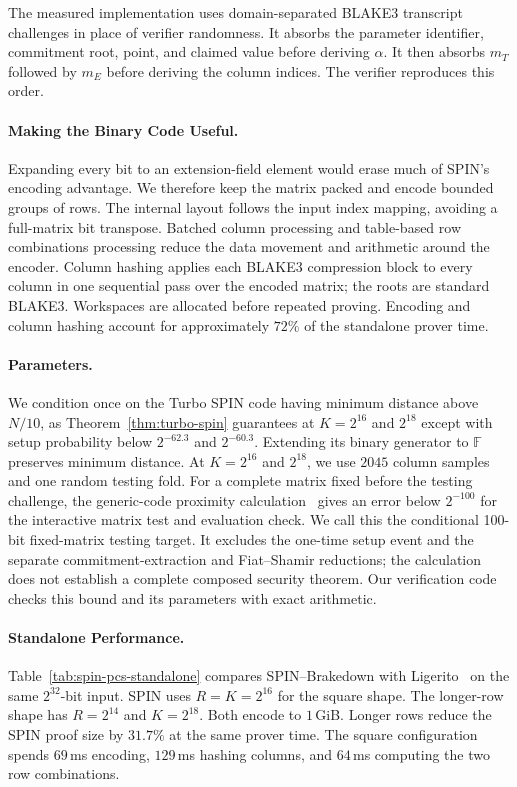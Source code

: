 The measured implementation uses domain-separated BLAKE3 transcript
challenges in place of verifier randomness. It absorbs the parameter
identifier, commitment root, point, and claimed value before deriving
$\alpha$. It then absorbs $m_T$ followed by $m_E$ before deriving the
column indices. The verifier reproduces this order.

\paragraph{Making the Binary Code Useful.}
Expanding every bit to an extension-field element would erase much of
SPIN's encoding advantage. We therefore keep the matrix packed and
encode bounded groups of rows. The internal layout follows the input
index mapping, avoiding a full-matrix bit transpose. Batched column
processing and table-based row combinations processing reduce the data movement
and arithmetic around the encoder. Column hashing applies each BLAKE3
compression block to every column in one sequential pass over the encoded
matrix; the roots are standard BLAKE3. Workspaces are allocated before
repeated proving. Encoding and column hashing account for approximately
$72\%$ of the standalone prover time.

\paragraph{Parameters.}
We condition once on the Turbo SPIN code having minimum distance above
$N/10$, as Theorem~\ref{thm:turbo-spin} guarantees at $K=2^{16}$ and
$2^{18}$ except with setup probability below $2^{-62.3}$ and $2^{-60.3}$.
Extending its binary generator to
$\mathbb F$ preserves minimum distance. At $K=2^{16}$ and $2^{18}$,
we use $2045$ column samples and one random testing fold. For a complete
matrix fixed before the testing challenge, the generic-code proximity
calculation~\cite{diamondPosen24} gives an error below $2^{-100}$ for the
interactive matrix test and evaluation check. We call this
the conditional 100-bit fixed-matrix testing target. It excludes the one-time setup
event and the separate commitment-extraction and Fiat--Shamir reductions;
the calculation does not establish a complete composed security theorem.
Our verification code checks this bound and its parameters with exact arithmetic.

\paragraph{Standalone Performance.}
Table~\ref{tab:spin-pcs-standalone} compares SPIN--Brakedown with
Ligerito~\cite{ligerito25} on the same $2^{32}$-bit input. SPIN uses
$R=K=2^{16}$ for the square shape. The longer-row shape has $R=2^{14}$
and $K=2^{18}$. Both encode to $1$\,GiB.
Longer rows reduce the SPIN proof
size by $31.7\%$ at the same prover time. The square configuration
spends $69$\,ms encoding, $129$\,ms hashing columns, and $64$\,ms
computing the two row combinations.

